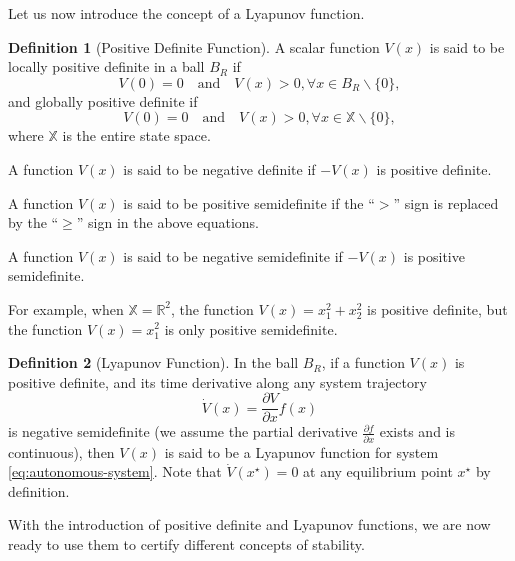\documentclass[
]{book}
\theoremstyle{definition}
\newtheorem{definition}{Definition}[chapter]
\theoremstyle{definition}
\theoremstyle{definition}
\theoremstyle{definition}
\theoremstyle{remark}
\begin{document}
Let us now introduce the concept of a Lyapunov function.

\begin{definition}[Positive Definite Function]
\protect\hypertarget{def:positivedefinitefunction}{}\label{def:positivedefinitefunction}A scalar function \(V(x)\) is said to be locally positive definite in a ball \(B_R\) if
\[
V(0) = 0 \quad \text{and} \quad V(x) > 0, \forall x \in B_R \backslash \{0\},
\]
and globally positive definite if
\[
V(0) = 0 \quad \text{and} \quad V(x) > 0, \forall x \in \mathbb{X} \backslash \{0\},
\]
where \(\mathbb{X}\) is the entire state space.

A function \(V(x)\) is said to be negative definite if \(-V(x)\) is positive definite.

A function \(V(x)\) is said to be positive semidefinite if the ``\(>\)'' sign is replaced by the ``\(\geq\)'' sign in the above equations.

A function \(V(x)\) is said to be negative semidefinite if \(-V(x)\) is positive semidefinite.
\end{definition}

For example, when \(\mathbb{X} = \mathbb{R}^2\), the function \(V(x) = x_1^2 + x_2^2\) is positive definite, but the function \(V(x) = x_1^2\) is only positive semidefinite.

\begin{definition}[Lyapunov Function]
\protect\hypertarget{def:lyapunovfunction}{}\label{def:lyapunovfunction}In the ball \(B_R\), if a function \(V(x)\) is positive definite, and its time derivative along any system trajectory
\[
\dot{V}(x) = \frac{\partial V}{\partial x} f(x)
\]
is negative semidefinite (we assume the partial derivative \(\frac{\partial f}{\partial x}\) exists and is continuous), then \(V(x)\) is said to be a Lyapunov function for system \eqref{eq:autonomous-system}. Note that \(\dot{V}(x^\star) = 0\) at any equilibrium point \(x^\star\) by definition.
\end{definition}

With the introduction of positive definite and Lyapunov functions, we are now ready to use them to certify different concepts of stability.
\end{document}
